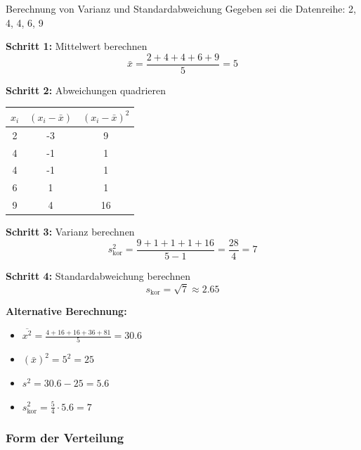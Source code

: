 \begin{example2}{Berechnung von Varianz und Standardabweichung}
Gegeben sei die Datenreihe: 2, 4, 4, 6, 9

\textbf{Schritt 1:} Mittelwert berechnen
$$\bar{x} = \frac{2 + 4 + 4 + 6 + 9}{5} = 5$$

\textbf{Schritt 2:} Abweichungen quadrieren
\begin{center}
\begin{tabular}{|c|c|c|}
\hline
$x_i$ & $(x_i - \bar{x})$ & $(x_i - \bar{x})^2$ \\
\hline
2 & -3 & 9 \\
4 & -1 & 1 \\
4 & -1 & 1 \\
6 & 1 & 1 \\
9 & 4 & 16 \\
\hline
\end{tabular}
\end{center}

\textbf{Schritt 3:} Varianz berechnen
$$s_{\text{kor}}^2 = \frac{9 +1 + 1 + 1 + 16}{5-1} = \frac{28}{4} = 7$$

\textbf{Schritt 4:} Standardabweichung berechnen
$$s_{\text{kor}} = \sqrt{7} \approx 2.65$$

\textbf{Alternative Berechnung:}
\begin{itemize}
    \item $\overline{x^2} = \frac{4 + 16 + 16 + 36 + 81}{5} = 30.6$
    \item $(\bar{x})^2 = 5^2 = 25$
    \item $s^2 = 30.6 - 25 = 5.6$
    \item $s_{\text{kor}}^2 = \frac{5}{4} \cdot 5.6 = 7$
\end{itemize}
\end{example2}

\subsubsection{Form der Verteilung}









